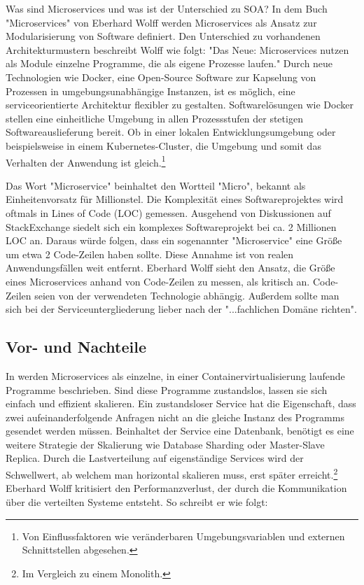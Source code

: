 Was sind Microservices und was ist der Unterschied zu SOA?
In dem Buch "Microservices" von Eberhard Wolff werden Microservices als Ansatz zur Modularisierung
von Software definiert. Den Unterschied zu vorhandenen Architekturmustern beschreibt Wolff wie folgt:
"Das Neue: Microservices nutzen als Module einzelne
Programme, die als eigene Prozesse laufen."\cite[S. 2]{MicroservicesBook}
Durch neue Technologien wie Docker, eine Open-Source Software
zur Kapselung von Prozessen in umgebungsunabhängige Instanzen, \cite{DockerOverview}
ist es möglich, eine serviceorientierte Architektur flexibler
zu gestalten. Softwarelösungen wie Docker stellen eine einheitliche Umgebung in
allen Prozessstufen der stetigen Softwareauslieferung bereit.
Ob in einer lokalen Entwicklungsumgebung oder beispielsweise in einem
Kubernetes-Cluster, die Umgebung und somit das
Verhalten der Anwendung ist gleich.\footnote{Von Einflussfaktoren
wie veränderbaren Umgebungsvariablen und externen Schnittstellen abgesehen.}

Das Wort "Microservice" beinhaltet den Wortteil "Micro",
bekannt als Einheitenvorsatz für Millionstel. Die Komplexität eines Softwareprojektes
wird oftmals in Lines of Code (LOC) gemessen. Ausgehend
von Diskussionen auf StackExchange siedelt sich ein komplexes Softwareprojekt bei
ca. 2 Millionen LOC an.\cite{ProjectsizeStackexchange}
Daraus würde folgen, dass ein sogenannter "Microservice" eine Größe um etwa
2 Code-Zeilen haben sollte. Diese Annahme ist von realen
Anwendungsfällen weit entfernt. Eberhard Wolff sieht den Ansatz,
die Größe eines Microservices anhand von Code-Zeilen zu
messen, als kritisch an. Code-Zeilen seien von der verwendeten
Technologie abhängig. Außerdem sollte man sich bei der
Serviceuntergliederung lieber nach der "...fachlichen Domäne richten".\cite[S. 31 und 32]{MicroservicesBook}

\subsection{Vor- und Nachteile}
\label{subsec:vorundnachteile}
In  werden Microservices
als einzelne, in einer Containervirtualisierung laufende Programme beschrieben. Sind diese Programme
zustandslos, lassen sie sich einfach und effizient skalieren. Ein zustandsloser Service hat die Eigenschaft, dass zwei
aufeinanderfolgende Anfragen nicht an die gleiche Instanz des Programms gesendet werden müssen.
Beinhaltet der Service eine Datenbank, benötigt es eine weitere Strategie der Skalierung
wie Database Sharding oder Master-Slave Replica. Durch die Lastverteilung auf eigenständige Services
wird der Schwellwert, ab welchem man horizontal skalieren muss, erst später erreicht.\footnote{Im Vergleich zu einem Monolith.}
Eberhard Wolff kritisiert den Performanzverlust, der durch die
Kommunikation über die verteilten Systeme entsteht. So schreibt er wie folgt: 

